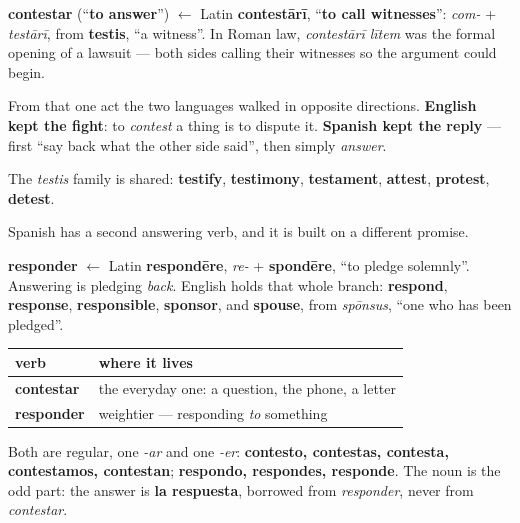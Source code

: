\begin{cousinweb}
\textbf{contestar} (\textquotedblleft{}\textbf{to answer}\textquotedblright{}) $\leftarrow$ Latin \textbf{contestārī}, \textquotedblleft{}\textbf{to call witnesses}\textquotedblright{}: \emph{com-} + \emph{testārī}, from \textbf{testis}, \textquotedblleft{}a witness\textquotedblright{}. In Roman law, \emph{contestārī lītem} was the formal opening of a lawsuit — both sides calling their witnesses so the argument could begin.

From that one act the two languages walked in opposite directions. \textbf{English kept the fight}: to \emph{contest} a thing is to dispute it. \textbf{Spanish kept the reply} — first \textquotedblleft{}say back what the other side said\textquotedblright{}, then simply \emph{answer}.

The \emph{testis} family is shared: \textbf{testify}, \textbf{testimony}, \textbf{testament}, \textbf{attest}, \textbf{protest}, \textbf{detest}.
\end{cousinweb}

\begin{grammarlens}[title={Grammar Lens: contestar and responder}]
Spanish has a second answering verb, and it is built on a different promise.

\textbf{responder} $\leftarrow$ Latin \textbf{respondēre}, \emph{re-} + \textbf{spondēre}, \textquotedblleft{}to pledge solemnly\textquotedblright{}. Answering is pledging \emph{back}. English holds that whole branch: \textbf{respond}, \textbf{response}, \textbf{responsible}, \textbf{sponsor}, and \textbf{spouse}, from \emph{spōnsus}, \textquotedblleft{}one who has been pledged\textquotedblright{}.

\noindent
\begin{tabularx}{\linewidth}{@{}>{\raggedright\arraybackslash}X>{\raggedright\arraybackslash}X@{}}
\toprule
\textbf{verb} & \textbf{where it lives} \\
\midrule
\textbf{contestar} & the everyday one: a question, the phone, a letter \\
\textbf{responder} & weightier — responding \emph{to} something \\
\bottomrule
\end{tabularx}

Both are regular, one \emph{-ar} and one \emph{-er}: \textbf{contesto, contestas, contesta, contestamos, contestan}; \textbf{respondo, respondes, responde}. The noun is the odd part: the answer is \textbf{la respuesta}, borrowed from \emph{responder}, never from \emph{contestar}.
\end{grammarlens}

